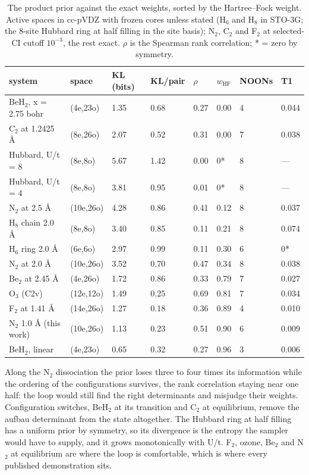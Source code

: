 \documentclass[11pt]{article}
\begin{document}
\begin{table}[htbp]
\centering
\caption{The product prior against the exact weights, sorted by the Hartree--Fock weight. Active spaces in cc-pVDZ with frozen cores unless stated (H$_6$ and H$_8$ in STO-3G; the 8-site Hubbard ring at half filling in the site basis); N$_2$, C$_2$ and F$_2$ at selected-CI cutoff $10^{-3}$, the rest exact. $\rho$ is the Spearman rank correlation; * = zero by symmetry.}\label{tab:6}
\footnotesize
\renewcommand{\arraystretch}{1.15}

\begin{tabular}{@{}llllllll@{}}
\toprule
system & space & KL (bits) & KL/pair & $\rho$ & $w_{\mathrm{HF}}$ & NOONs & T1 \\
\midrule
BeH$_2$, x = 2.75 bohr & (4e,23o) & 1.35 & 0.68 & 0.27 & 0.00 & 4 & 0.044 \\
C$_2$ at 1.2425 \AA{} & (8e,26o) & 2.07 & 0.52 & 0.31 & 0.00 & 7 & 0.038 \\
Hubbard, U/t = 8 & (8e,8o) & 5.67 & 1.42 & 0.00 & 0* & 8 & --- \\
Hubbard, U/t = 4 & (8e,8o) & 3.81 & 0.95 & 0.01 & 0* & 8 & --- \\
N$_2$ at 2.5 \AA{} & (10e,26o) & 4.28 & 0.86 & 0.41 & 0.12 & 8 & 0.037 \\
H$_8$ chain 2.0 \AA{} & (8e,8o) & 3.40 & 0.85 & 0.11 & 0.21 & 8 & 0.074 \\
H$_6$ ring 2.0 \AA{} & (6e,6o) & 2.97 & 0.99 & 0.11 & 0.30 & 6 & 0* \\
N$_2$ at 2.0 \AA{} & (10e,26o) & 3.52 & 0.70 & 0.47 & 0.34 & 8 & 0.038 \\
Be$_2$ at 2.45 \AA{} & (4e,26o) & 1.72 & 0.86 & 0.33 & 0.79 & 7 & 0.027 \\
O$_3$ (C2v) & (12e,12o) & 1.49 & 0.25 & 0.69 & 0.81 & 7 & 0.034 \\
F$_2$ at 1.41 \AA{} & (14e,26o) & 1.27 & 0.18 & 0.36 & 0.89 & 4 & 0.010 \\
N$_2$ 1.0 \AA{} (this work) & (10e,26o) & 1.13 & 0.23 & 0.51 & 0.90 & 6 & 0.009 \\
BeH$_2$, linear & (4e,23o) & 0.65 & 0.32 & 0.27 & 0.96 & 3 & 0.006 \\
\bottomrule
\end{tabular}
\end{table}


Along the N$_2$ dissociation the prior loses three to four times its information while the ordering of the configurations survives, the rank correlation staying near one half: the loop would still find the right determinants and misjudge their weights. Configuration switches, BeH$_2$ at its transition and C$_2$ at equilibrium, remove the aufbau determinant from the state altogether. The Hubbard ring at half filling has a uniform prior by symmetry, so its divergence is the entropy the sampler would have to supply, and it grows monotonically with U/t. F$_2$, ozone, Be$_2$ and N$_2$ at equilibrium are where the loop is comfortable, which is where every published demonstration sits.
\end{document}
